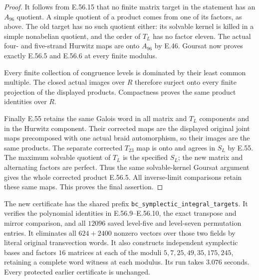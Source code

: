\begin{proof}
It follows from E.56.15 that no finite matrix
target in the statement has an $A_{96}$
quotient. A simple quotient of a product
comes from one of its factors, as above.
The old target has no such quotient either:
its solvable kernel is killed in a simple
nonabelian quotient, and the order of $T_L$
has no factor eleven. The actual four- and
five-strand Hurwitz maps are onto $A_{96}$
by E.46. Goursat now proves exactly
E.56.5 and E.56.6 at every finite modulus.

Every finite collection of congruence levels
is dominated by their least common multiple.
The closed actual images over $R$ therefore
surject onto every finite projection of the
displayed products. Compactness proves the
same product identities over $R$.

Finally E.55 retains the same Galois word in
all matrix and $T_L$ components and in the
Hurwitz component. Their corrected maps
are the displayed original joint maps
precomposed with one actual braid
automorphism, so their images are the same
products. The separate corrected $T_{23}$
map is onto and agrees in $S_L$ by E.55.
The maximum solvable quotient of $T_L$ is
the specified $S_L$; the new matrix and
alternating factors are perfect. Thus the
same solvable-kernel Goursat argument gives
the whole corrected product E.56.5.
All inverse-limit comparisons retain these
same maps. This proves the final assertion.
\end{proof}

The new certificate has the shared prefix
\texttt{bc\_symplectic\_integral\_targets}.
It verifies the polynomial identities in
E.56.9--E.56.10, the exact transpose and
mirror comparison, and all $12096$ saved
level-five and level-seven permutation entries.
It eliminates all $624+2400$ nonzero vectors
over those two fields by literal original
transvection words. It also constructs
independent symplectic bases and factors
$16$ matrices at each of the moduli
$5,7,25,49,35,175,245$, retaining a complete
word witness at each modulus. Its run takes
$3.076$ seconds. Every protected earlier
certificate is unchanged.
